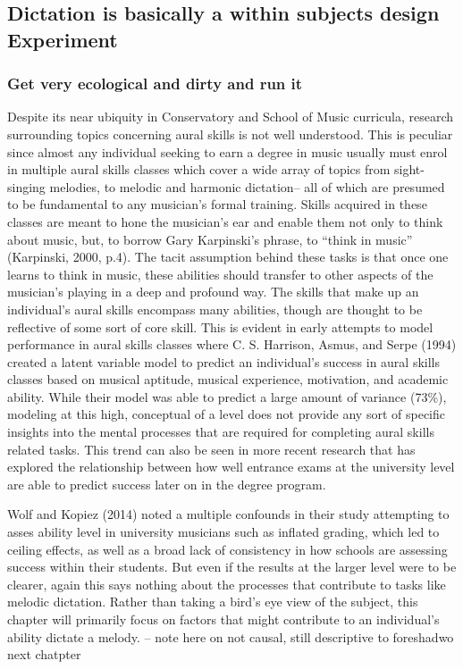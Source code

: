 \documentclass[]{book}
\begin{document}
\hypertarget{dictation-is-basically-a-within-subjects-design-experiment}{%
\subsection{Dictation is basically a within subjects design Experiment}\label{dictation-is-basically-a-within-subjects-design-experiment}}

\hypertarget{get-very-ecological-and-dirty-and-run-it}{%
\subsubsection{Get very ecological and dirty and run it}\label{get-very-ecological-and-dirty-and-run-it}}

Despite its near ubiquity in Conservatory and School of Music curricula, research surrounding topics concerning aural skills is not well understood.
This is peculiar since almost any individual seeking to earn a degree in music usually must enrol in multiple aural skills classes which cover a wide array of topics from sight-singing melodies, to melodic and harmonic dictation-- all of which are presumed to be fundamental to any musician's formal training.
Skills acquired in these classes are meant to hone the musician's ear and enable them not only to think about music, but, to borrow Gary Karpinski's phrase, to ``think in music'' (Karpinski, 2000, p.4).
The tacit assumption behind these tasks is that once one learns to think in music, these abilities should transfer to other aspects of the musician's playing in a deep and profound way.
The skills that make up an individual's aural skills encompass many abilities, though are thought to be reflective of some sort of core skill.
This is evident in early attempts to model performance in aural skills classes where C. S. Harrison, Asmus, and Serpe (1994) created a latent variable model to predict an individual's success in aural skills classes based on musical aptitude, musical experience, motivation, and academic ability.
While their model was able to predict a large amount of variance (73\%), modeling at this high, conceptual of a level does not provide any sort of specific insights into the mental processes that are required for completing aural skills related tasks.
This trend can also be seen in more recent research that has explored the relationship between how well entrance exams at the university level are able to predict success later on in the degree program.

Wolf and Kopiez (2014) noted a multiple confounds in their study attempting to asses ability level in university musicians such
as inflated grading, which led to ceiling effects, as well as a broad lack of consistency in how schools are assessing success within their students.
But even if the results at the larger level were to be clearer, again this says nothing about the processes that contribute to tasks like melodic dictation.
Rather than taking a bird's eye view of the subject, this chapter will primarily focus on factors that might contribute to an individual's ability dictate a melody.
-- note here on not causal, still descriptive to foreshadwo next chatpter
\end{document}
